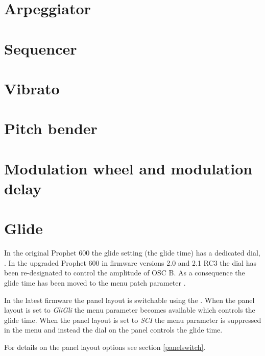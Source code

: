 \documentclass[landscape, 11pt, oneside]{report}
\newenvironment{flowtext}{\addmargin[0cm]{7cm}}{\endaddmargin} %
\begin{document}
\begin{flowtext}
\section{Arpeggiator}\label{arp}



\section{Sequencer}\label{seq}



\section{Vibrato}\label{vib}



\section{Pitch bender}\label{pitchbend}



\section{Modulation wheel and modulation delay}\label{modwheel}



\section{Glide}\label{glide}

In the original Prophet 600 the glide setting (the glide time) has a dedicated dial, \glidepot. In the upgraded Prophet 600 in firmware versions 2.0 and 2.1 RC3 the dial has been re-designated to control the amplitude of OSC B. As a consequence the glide time has been moved to the menu patch parameter \glide. 

In the latest firmware the panel layout is switchable using the \miscsett \panelswitch. When the panel layout is set to \textit{GliGli} the menu parameter \glide becomes available which controls the glide time. When the panel layout is set to \textit{SCI} the menu parameter \glide is suppressed in the menu and instead the \glidepot dial on the panel controls the glide time. 

For details on the panel layout options see section \ref{panelswitch}.


\end{flowtext}
\end{document}
